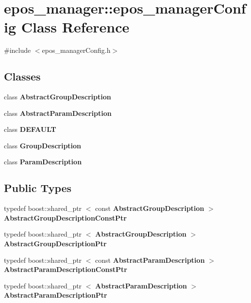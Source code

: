 \section{epos\-\_\-manager\-:\-:epos\-\_\-manager\-Config \-Class \-Reference}
\label{classepos__manager_1_1epos__managerConfig}


{\ttfamily \#include $<$epos\-\_\-manager\-Config.\-h$>$}

\subsection*{\-Classes}
\begin{DoxyCompactItemize}
\item 
class {\bf \-Abstract\-Group\-Description}
\item 
class {\bf \-Abstract\-Param\-Description}
\item 
class {\bf \-D\-E\-F\-A\-U\-L\-T}
\item 
class {\bf \-Group\-Description}
\item 
class {\bf \-Param\-Description}
\end{DoxyCompactItemize}
\subsection*{\-Public \-Types}
\begin{DoxyCompactItemize}
\item 
typedef boost\-::shared\-\_\-ptr\*
$<$ const \*
{\bf \-Abstract\-Group\-Description} $>$ {\bf \-Abstract\-Group\-Description\-Const\-Ptr}
\item 
typedef boost\-::shared\-\_\-ptr\*
$<$ {\bf \-Abstract\-Group\-Description} $>$ {\bf \-Abstract\-Group\-Description\-Ptr}
\item 
typedef boost\-::shared\-\_\-ptr\*
$<$ const \*
{\bf \-Abstract\-Param\-Description} $>$ {\bf \-Abstract\-Param\-Description\-Const\-Ptr}
\item 
typedef boost\-::shared\-\_\-ptr\*
$<$ {\bf \-Abstract\-Param\-Description} $>$ {\bf \-Abstract\-Param\-Description\-Ptr}
\end{DoxyCompactItemize}
